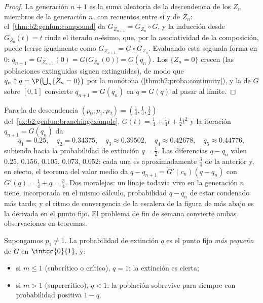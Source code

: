 \begin{proof}
La generación $n + 1$ es la suma aleatoria de la descendencia de los
$Z_n$ miembros de la generación $n$, con recuentos 
entre sí y de $Z_n$: el~\cref{thm:b2:genfun:compound} da $G_{Z_{n+1}}
= G_{Z_n} \circ G$, y la inducción desde $G_{Z_0}(t) = t$ rinde el
iterado $n$-ésimo, que, por la asociatividad de la composición, puede
leerse igualmente como $G_{Z_{n+1}} = G \circ G_{Z_n}$. Evaluando
esta segunda forma en $0$: $q_{n+1} = G_{Z_{n+1}}(0) =
G\bigl(G_{Z_n}(0)\bigr) = G(q_n)$. Los  $\{Z_n = 0\}$ crecen
(las poblaciones extinguidas siguen extinguidas), de modo que $q_n
\uparrow q = \P\bigl(\bigcup_n\{Z_n = 0\}\bigr)$ por la
 monótona (\cref{thm:b2:proba:continuity}), y la
 de $G$ sobre $[0, 1]$ convierte $q_{n+1} = G(q_n)$ en $q =
G(q)$ al pasar al límite.
\end{proof}

\begin{example}
\label{ex:b2:genfun:cobwebnumerics}
Para la  de descendencia $(p_0, p_1, p_2) = (\tfrac14, \tfrac14,
\tfrac12)$ del~\cref{ex:b2:genfun:branchingexample}, $G(t) = \tfrac14
+ \tfrac14t + \tfrac12t^2$ y la iteración $q_{n+1} = G(q_n)$ da
\[
q_1 = 0.25, \quad q_2 = 0.34375, \quad q_3 \approx 0.39502,
\quad q_4 \approx 0.42678, \quad q_5 \approx 0.44776,
\]
subiendo hacia la probabilidad de extinción $q = \tfrac12$. Las
diferencias $q - q_n$ valen $0.25$, $0.156$, $0.105$, $0.073$,
$0.052$: cada una es aproximadamente $\tfrac34$ de la anterior y, en
efecto, el teorema del valor medio da $q - q_{n+1} = G'(c_n)(q -
q_n)$ con $G'(q) = \tfrac14 + q = \tfrac34$. Dos moralejas: un linaje
todavía vivo en la generación $n$ tiene, incorporada en el mismo
cálculo, probabilidad $q - q_n$ de estar condenado más tarde; y el
ritmo de convergencia de la escalera de la figura de más abajo es la
derivada en el punto fijo. El problema de fin de semana convierte
ambas observaciones en teoremas.
\end{example}

\begin{theorem}\label{thm:b2:genfun:extinction}
Supongamos $p_1 \neq 1$. La probabilidad de extinción $q$ es el punto
fijo \emph{más pequeño} de $G$ en $\intcc{0}{1}$, y:
\begin{itemize}
\item si $m \leq 1$ (subcrítico o crítico), $q = 1$: la extinción es
cierta;
\item si $m > 1$ (supercrítico), $q < 1$: la población sobrevive para
siempre con probabilidad positiva $1 - q$.
\end{itemize}
\end{theorem}

